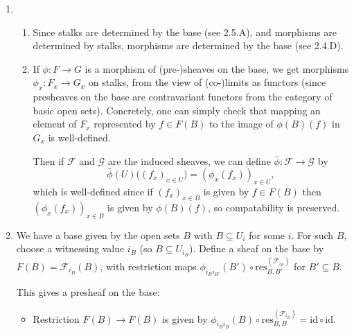 \documentclass{report}
\newcommand{\induced}[1]{\bar{#1}} %
\newcommand{\id}{{\mathrm{id}}} %
\newcommand{\res}{{\mathrm{res}}} %
\newcommand{\scrF}{\mathscr{F}}
\newcommand{\scrG}{\mathscr{G}}
\begin{document}
\begin{enumerate}[label=\textbf{2.5.\Alph*.}]
	\item
	      \begin{enumerate}[label=(\alph*)]
		      \item Since stalks are determined by the base (see 2.5.A), and
		            morphisms are determined by stalks, morphisms are determined by
		            the base (see 2.4.D).

		      \item If $\phi:F\to G$ is a morphism of (pre-)sheaves on the base, we get
		            morphisms $\phi_x:F_x\to G_x$ on stalks, from the view of
		            (co-)limits as functors (since presheaves on the
		            base are contravariant functors from the category of basic open
		            sets). Concretely, one can simply check that mapping an element
		            of $F_x$ represented by $f\in F(B)$ to the image of $\phi(B)(f)$
		            in $G_x$ is well-defined.

		            Then if $\scrF$ and $\scrG$ are the induced sheaves, we can define
		            $\induced\phi:\scrF\to\scrG$ by
		            \begin{equation*}
			            \induced\phi(U)\bigl((f_x)_{x\in U}\bigr)
			            = (\phi_x(f_x))_{x\in U},
		            \end{equation*}
		            which is well-defined since if $(f_x)_{x\in B}$ is given by
		            $f\in F(B)$ then $(\phi_x(f_x))_{x\in B}$ is given by
		            $\phi(B)(f)$, so compatability is preserved.
	      \end{enumerate}

	\item We have a base given by the open sets $B$ with $B\subseteq U_i$ for
	      some $i$. For such $B$, choose a witnessing value $i_B$ (so
	      $B\subseteq U_{i_B}$). Define a sheaf on the base by $F(B)=\scrF_{i_B}(B)$,
	      with restriction maps $\phi_{i_Bi_{B'}}(B')\circ\res^{(\scrF_{i_B})}_{B,B'}$
	      for $B'\subseteq B$.

	      This gives a presheaf on the base:
	      \begin{itemize}
		      \item Restriction $F(B)\to F(B)$ is given by
		            $\phi_{i_Bi_B}(B)\circ\res^{(\scrF_{i_B})}_{B,B}=\id\circ\id$.


\end{itemize}
\end{enumerate}
\end{document}
